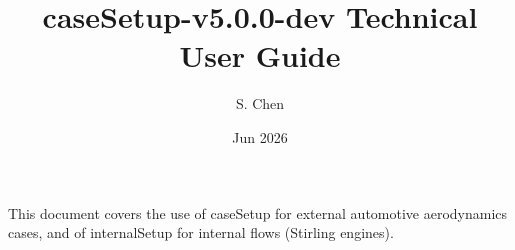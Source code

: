 \documentclass[11pt]{article}
\title{caseSetup-v5.0.0-dev Technical User Guide}
\author{S. Chen}
\date{Jun 2026}
\begin{document}
\vspace{5cm}
\maketitle


\vspace{2cm}

\small \noindent This document covers the use of caseSetup for external automotive aerodynamics cases, and of internalSetup for internal flows (Stirling engines).\newline


\newpage
\newpage
\tableofcontents
\newpage

\newpage











\newpage
\end{document}
